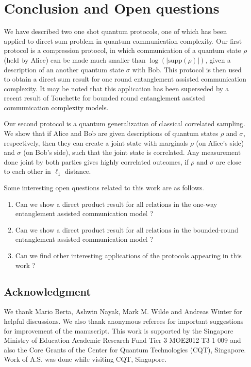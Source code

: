 \documentclass[11pt,a4paper]{article}
\theoremstyle{plain}
\theoremstyle{definition}
\begin{document}
\section{Conclusion and Open questions}
\label{sec:conclusion}
 
We have described two one shot quantum protocols, one of which has been applied to direct sum problem in quantum communication complexity. Our first protocol is a compression protocol, in which communication of a quantum state $\rho$ (held by Alice) can be made much smaller than $\log(|\text{supp}(\rho)|)$, given a description of an another quantum state $\sigma$ with Bob. This protocol is then used to obtain a direct sum result for one round entanglement assisted communication complexity. It may be noted that this application has been superseded by a recent result of Touchette \cite{Touchette:2015} for bounded round entanglement assisted communication complexity models. 

Our second protocol is a quantum generalization of classical correlated sampling. We show that if Alice and Bob are given descriptions of quantum states $\rho$ and $\sigma$, respectively, then they can create a joint state with marginals $\rho$ (on Alice's side) and $\sigma$ (on Bob's side), such that the joint state is correlated. Any measurement done joint by both parties gives highly correlated outcomes, if $\rho$ and $\sigma$ are close to each other in $\ell_1$ distance. 

Some interesting open questions related to this work are as follows.

\begin{enumerate}
\item Can we show a direct product result for all relations in the  one-way entanglement assisted communication model ?
\item Can we show a direct product result for all relations in the bounded-round   entanglement assisted communication model ?
\item Can we find other interesting applications of the protocols appearing in this work ?
\end{enumerate}

\subsection*{Acknowledgment} We thank Mario Berta, Ashwin Nayak, Mark M. Wilde and Andreas Winter for helpful discussions. We also thank anonymous referees for important suggestions for improvement of the manuscript. This work is supported by the Singapore Ministry of Education Academic Research Fund Tier 3 MOE2012-T3-1-009 and also the Core Grants of the Center for Quantum Technologies (CQT), Singapore. Work of A.S. was done while visiting CQT, Singapore. 



\end{document}
